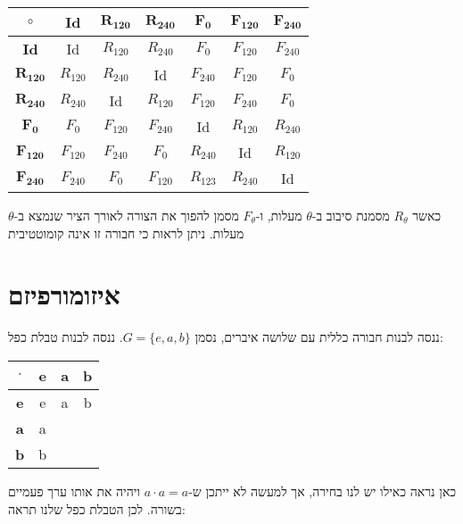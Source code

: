\documentclass{tstextbook}
\begin{document}
\begin{table}[htbp]
  \centering
  \begin{tabular}{|ccccccc|}
    \hline
    \(\circ\) & \textbf{Id} & \(\mathbf{R_{120}}\) & \(\mathbf{R_{240}}\) & \(\mathbf{F_{0}}\) & \(\mathbf{F_{120}}\) & \(\mathbf{F_{240}}\) \\ \hline
    \textbf{Id} & Id & \(R_{120}\) & \(R_{240}\) & \(F_{0}\) & \(F_{120}\) & \(F_{240}\) \\ \hline
    \(\mathbf{R_{120}}\) & \(R_{120}\) & \(R_{240}\) & Id & \(F_{240}\) & \(F_{120}\) & \(F_{0}\) \\ \hline
    \(\mathbf{R_{240}}\) & \(R_{240}\) & Id & \(R_{120}\) & \(F_{120}\) & \(F_{240}\) & \(F_{0}\) \\ \hline
    \(\mathbf{F_{0}}\) & \(F_{0}\) & \(F_{120}\) & \(F_{240}\) & Id & \(R_{120}\) & \(R_{240}\) \\ \hline
    \(\mathbf{F_{120}}\) & \(F_{120}\) & \(F_{240}\) & \(F_{0}\) & \(R_{240}\) & Id & \(R_{120}\) \\ \hline
    \(\mathbf{F_{240}}\) & \(F_{240}\) & \(F_{0}\) & \(F_{120}\) & \(R_{123}\) & \(R_{240}\) & Id \\ \hline
  \end{tabular}
\end{table}
כאשר \(R_{\theta}\) מסמנת סיבוב ב-\(\theta\) מעלות, ו-\(F_{\theta}\) מסמן להפוך את הצורה לאורך הציר שנמצא ב-\(\theta\) מעלות.
ניתן לראות כי חבורה זו אינה קומוטטיבית

\section{איזומורפיזם}

ננסה לבנות חבורה כללית עם שלושה איברים, נסמן \(G=\{ e,a,b \}\). ננסה לבנות טבלת כפל:

\begin{table}[htbp]
  \centering
  \begin{tabular}{|cccc|}
    \hline
    \(\cdot\) & e & a & b \\ \hline
    \textbf{e} & e & a & b \\ \hline
    \textbf{a} & a &  &  \\ \hline
    \textbf{b} & b &  &  \\ \hline
  \end{tabular}
\end{table}
כאן נראה כאילו יש לנו בחירה, אך למעשה לא ייתכן ש-\(a\cdot a=a\) ויהיה את אותו ערך פעמיים בשורה. לכן הטבלת כפל שלנו תראה:
\end{document}
